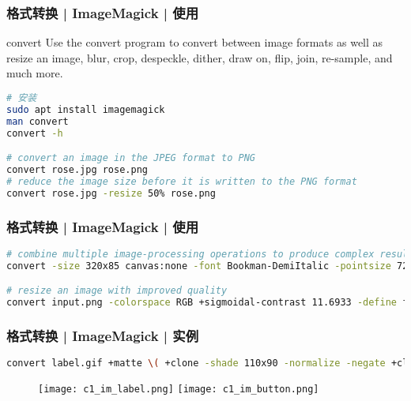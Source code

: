 \begin{frame}[fragile]
  \frametitle{格式转换 | ImageMagick | \alert{使用}}
  \begin{block}{convert}
Use the convert program to convert between image formats as well as resize an image, blur, crop, despeckle, dither, draw on, flip, join, re-sample, and much more. 
  \end{block}
\begin{lstlisting}[language=bash]
# 安装
sudo apt install imagemagick
man convert
convert -h

# convert an image in the JPEG format to PNG
convert rose.jpg rose.png
# reduce the image size before it is written to the PNG format
convert rose.jpg -resize 50% rose.png
\end{lstlisting}
\end{frame}

\begin{frame}[fragile]
  \frametitle{格式转换 | ImageMagick | 使用}
\begin{lstlisting}[language=bash]
# combine multiple image-processing operations to produce complex results
convert -size 320x85 canvas:none -font Bookman-DemiItalic -pointsize 72 -draw "text 25,60 \'Magick\'" -channel RGBA -blur 0x6 -fill darkred -stroke magenta -draw "text 20,55 \'Magick\'" fuzzy-magick.png

# resize an image with improved quality
convert input.png -colorspace RGB +sigmoidal-contrast 11.6933 -define filter:filter=Sinc -define filter:window=Jinc -define filter:lobes=3 -resize 400% -sigmoidal-contrast 11.6933 -colorspace sRGB output.png
\end{lstlisting}
\end{frame}

\begin{frame}[fragile]
  \frametitle{格式转换 | ImageMagick | 实例}
\begin{lstlisting}[language=bash]
convert label.gif +matte \( +clone -shade 110x90 -normalize -negate +clone -compose Plus -composite \) \( -clone 0 -shade 110x50 -normalize -channel BG -fx 0 +channel -matte \) -delete 0 +swap -compose Multiply -composite button.gif
\end{lstlisting}
\begin{figure}
  \centering
  \texttt{[image: c1\_im\_label.png]}\qquad
  \texttt{[image: c1\_im\_button.png]}
\end{figure}
\end{frame}

